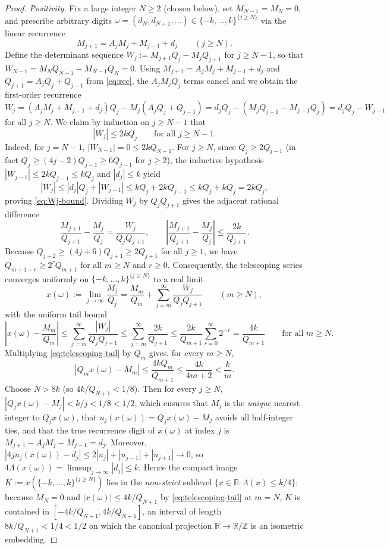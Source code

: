 \documentclass[11pt]{article}
\theoremstyle{definition}
\theoremstyle{remark}
\newcommand{\R}{\mathbb{R}}
\newcommand{\Z}{\mathbb{Z}}
\newcommand{\Lam}{\Lambda}
\begin{document}
\begin{proof}
\emph{Positivity.} Fix a large integer $N\ge2$ (chosen below), set
$M_{N-1}=M_N=0$, and prescribe arbitrary digits
$\omega=(d_N,d_{N+1},\dots)\in\{-k,\ldots,k\}^{\{j\ge N\}}$ via the linear
recurrence
\[
M_{j+1}=A_jM_j+M_{j-1}+d_j\qquad(j\ge N).
\]
Define the determinant sequence $W_j:=M_{j+1}Q_j-M_jQ_{j+1}$ for $j\ge N-1$, so
that $W_{N-1}=M_NQ_{N-1}-M_{N-1}Q_N=0$. Using $M_{j+1}=A_jM_j+M_{j-1}+d_j$ and
$Q_{j+1}=A_jQ_j+Q_{j-1}$ from \eqref{eq:rec}, the $A_jM_jQ_j$ terms cancel and
we obtain the first-order recurrence
\[
W_j=(A_jM_j+M_{j-1}+d_j)Q_j-M_j(A_jQ_j+Q_{j-1})
=d_jQ_j-(M_jQ_{j-1}-M_{j-1}Q_j)=d_jQ_j-W_{j-1}
\]
for all $j\ge N$. We claim by induction on $j\ge N-1$ that
\begin{equation}\label{eq:Wj-bound}
|W_j|\le 2kQ_j\qquad\text{for all }j\ge N-1.
\end{equation}
Indeed, for $j=N-1$, $|W_{N-1}|=0\le2kQ_{N-1}$. For $j\ge N$, since $Q_j\ge2Q_{j-1}$
(in fact $Q_j\ge(4j-2)Q_{j-1}\ge6Q_{j-1}$ for $j\ge2$), the inductive
hypothesis $|W_{j-1}|\le2kQ_{j-1}\le kQ_j$ and $|d_j|\le k$ yield
\[
|W_j|\le|d_j|Q_j+|W_{j-1}|\le kQ_j+2kQ_{j-1}\le kQ_j+kQ_j=2kQ_j,
\]
proving \eqref{eq:Wj-bound}. Dividing $W_j$ by $Q_jQ_{j+1}$ gives the adjacent
rational difference
\[
\frac{M_{j+1}}{Q_{j+1}}-\frac{M_j}{Q_j}=\frac{W_j}{Q_jQ_{j+1}},\qquad
\left|\frac{M_{j+1}}{Q_{j+1}}-\frac{M_j}{Q_j}\right|\le\frac{2k}{Q_{j+1}}.
\]
Because $Q_{j+2}\ge(4j+6)Q_{j+1}\ge2Q_{j+1}$ for all $j\ge1$, we have
$Q_{m+1+r}\ge2^r Q_{m+1}$ for all $m\ge N$ and $r\ge0$. Consequently, the
telescoping series converges uniformly on $\{-k,\dots,k\}^{\{j\ge N\}}$ to a
real limit
\[
x(\omega):=\lim_{j\to\infty}\frac{M_j}{Q_j}
=\frac{M_m}{Q_m}+\sum_{j=m}^\infty\frac{W_j}{Q_jQ_{j+1}}\qquad(m\ge N),
\]
with the uniform tail bound
\begin{equation}\label{eq:telescoping-tail}
\left|x(\omega)-\frac{M_m}{Q_m}\right|
\le\sum_{j=m}^\infty\frac{|W_j|}{Q_jQ_{j+1}}
\le\sum_{j=m}^\infty\frac{2k}{Q_{j+1}}
\le\frac{2k}{Q_{m+1}}\sum_{r=0}^\infty 2^{-r}
=\frac{4k}{Q_{m+1}}\qquad\text{for all }m\ge N.
\end{equation}
Multiplying \eqref{eq:telescoping-tail} by $Q_m$ gives, for every $m\ge N$,
\[
|Q_mx(\omega)-M_m|\le\frac{4kQ_m}{Q_{m+1}}\le\frac{4k}{4m+2}<\frac{k}{m}.
\]
Choose $N>8k$ (so $4k/Q_{N+1}<1/8$). Then for every $j\ge N$,
$|Q_jx(\omega)-M_j|<k/j<1/8<1/2$, which ensures that $M_j$ is the \emph{unique}
nearest integer to $Q_jx(\omega)$, that $u_j(x(\omega))=Q_jx(\omega)-M_j$ avoids
all half-integer ties, and that the true recurrence digit of $x(\omega)$ at
index $j$ is $M_{j+1}-A_jM_j-M_{j-1}=d_j$. Moreover,
$|4ju_j(x(\omega))-d_j|\le2|u_j|+|u_{j-1}|+|u_{j+1}|\to0$, so
$4\Lam(x(\omega))=\limsup_{j\to\infty}|d_j|\le k$. Hence the compact image
$K:=x(\{-k,\dots,k\}^{\{j\ge N\}})$ lies in the \emph{non-strict} sublevel
$\{x\in\R:\Lam(x)\le k/4\}$; because $M_N=0$ and $|x(\omega)|\le4k/Q_{N+1}$ by
\eqref{eq:telescoping-tail} at $m=N$, $K$ is contained in
$[-4k/Q_{N+1},4k/Q_{N+1}]$, an interval of length $8k/Q_{N+1}<1/4<1/2$ on which
the canonical projection $\R\to\R/\Z$ is an isometric embedding.


\end{proof}
\end{document}
